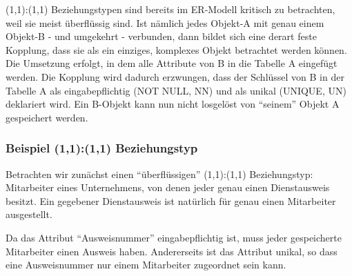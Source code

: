         \begin{center}
        \end{center}
        (1,1):(1,1) Beziehungstypen sind bereits im ER-Modell kritisch zu betrachten, weil sie meist \"uber\-fl\"us\-sig sind. Ist n\"amlich jedes Objekt-A mit genau einem Objekt-B - und umgekehrt - verbunden, dann bildet sich eine derart feste Kopplung, dass sie als ein einziges, komplexes Objekt betrachtet werden k\"onnen. Die Umsetzung erfolgt, in dem alle Attribute von B in die Tabelle A eingef\"ugt werden. Die Kopplung wird dadurch erzwungen, dass der Schl\"ussel von B in der Tabelle A als eingabepflichtig (NOT NULL, NN) und als unikal (UNIQUE, UN) deklariert wird. Ein B-Objekt kann nun nicht losgel\"ost von \enquote{seinem} Objekt A gespeichert werden.

        \subsubsection{Beispiel (1,1):(1,1) Beziehungstyp}
          Betrachten wir zun\"achst einen \enquote{\"uberfl\"ussigen} (1,1):(1,1) Beziehungstyp: Mitarbeiter eines Unternehmens, von denen jeder genau einen Dienstausweis besitzt. Ein gegebener Dienstausweis ist nat\"urlich f\"ur genau einen Mitarbeiter ausgestellt.

          Da das Attribut \enquote{Ausweisnummer} eingabepflichtig ist, muss jeder gespeicherte Mitarbeiter einen Ausweis haben. Andererseits ist das Attribut unikal, so dass eine Ausweisnummer nur einem Mitarbeiter zugeordnet sein kann.

